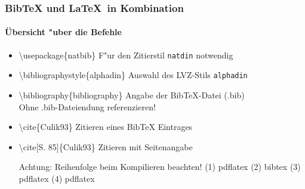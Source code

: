\begin{frame}
\frametitle{BibTeX und \LaTeX ~in Kombination}
\framesubtitle{\"Ubersicht "uber die Befehle}
\begin{itemize}

\item \color{nounibaredI}\textbackslash usepackage\color{black}\{natbib\} \hfill F"ur den Zitierstil \texttt{natdin} notwendig\\

\item \color{nounibaredI}\textbackslash bibliographystyle\color{black}\{alphadin\} \hfill Auswahl des LVZ-Stils \glqq \texttt{alphadin}\grqq\\

\item \color{nounibaredI}\textbackslash bibliography\color{black}\{bibliography\} \hfill Angabe der  BibTeX-Datei (.bib)\\
\hfill Ohne .bib-Dateiendung referenzieren!




\item \color{nounibaredI}\textbackslash cite\color{black}\{Culik93\} \hfill Zitieren eines BibTeX Eintrages\\

\item \color{nounibaredI}\textbackslash cite\color{black}[S. 85]\{Culik93\} \hfill Zitieren mit Seitenangabe\\

\bigskip

\begin{alertblock}{Achtung: Reihenfolge beim Kompilieren beachten!}
(1) pdflatex (2) bibtex (3) pdflatex (4) pdflatex
\end{alertblock}

\end{itemize}


\end{frame}

